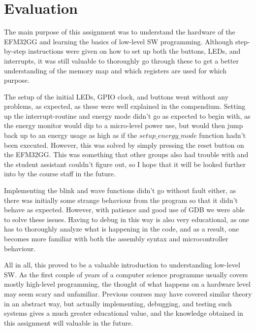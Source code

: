 \section{Evaluation}

The main purpose of this assignment was to understand the hardware of the EFM32GG and learning the basics of low-level SW programming. Although step-by-step instructions were given on how to set up both the buttons, LEDs, and interrupts, it was still valuable to thoroughly go through these to get a better understanding of the memory map and which registers are used for which purpose.

The setup of the initial LEDs, GPIO clock, and buttons went without any problems, as expected, as these were well explained in the compendium\cite{compendium}. Setting up the interrupt-routine and energy mode didn't go as expected to begin with, as the energy monitor would dip to a micro-level power use, but would then jump back up to an energy usage as high as if the $setup\_energy\_mode$ function hadn't been executed. However, this was solved by simply pressing the reset button on the EFM32GG. This was something that other groups also had trouble with and the student assistant couldn't figure out, so I hope that it will be looked further into by the course staff in the future.

Implementing the blink and wave functions didn't go without fault either, as there was initially some strange behaviour from the program so that it didn't behave as expected. However, with patience and good use of GDB we were able to solve these issues. Having to debug in this way is also very educational, as one has to thoroughly analyze what is happening in the code, and as a result, one becomes more familiar with both the assembly syntax and microcontroller behaviour.

All in all, this proved to be a valuable introduction to understanding low-level SW. As the first couple of years of a computer science programme usually covers mostly high-level programming, the thought of what happens on a hardware level may seem scary and unfamiliar. Previous courses may have covered similar theory in an abstract way, but actually implementing, debugging, and testing such systems gives a much greater educational value, and the knowledge obtained in this assignment will valuable in the future.